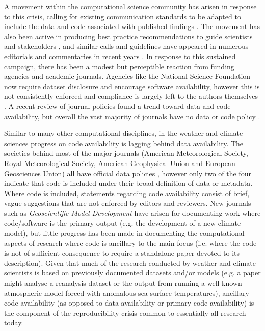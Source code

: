 A movement within the computational science community has arisen in response to this crisis, calling for existing communication standards to be adapted to include the data and code associated with published findings \citep[e.g.][]{Stodden2014}. The movement has also been active in producing best practice recommendations to guide scientists and stakeholders \citep[e.g.][]{Prlic2012,Stodden2012a,Sandve2013,Stodden2014}, and similar calls and guidelines have appeared in numerous editorials and commentaries in recent years \citep[e.g.][]{Barnes2010,Merali2010,Ince2012}. In response to this sustained campaign, there has been a modest but perceptible reaction from funding agencies and academic journals. Agencies like the National Science Foundation now require dataset disclosure and encourage software availability, however this is not consistently enforced and compliance is largely left to the authors themselves \citep{Stodden2013}. A recent review of journal policies found a trend toward data and code availability, but overall the vast majority of journals have no data or code policy \citep{Stodden2013}. 

Similar to many other computational disciplines, in the weather and climate sciences progress on code availability is lagging behind data availability. The societies behind most of the major journals (American Meteorological Society, Royal Meteorological Society, American Geophysical Union and European Geosciences Union) all have official data policies \citep[e.g.][]{Mayernik2015}, however only two of the four indicate that code is included under their broad definition of data or metadata. Where code is included, statements regarding code availability consist of brief, vague suggestions that are not enforced by editors and reviewers. New journals such as \textit{Geoscientific Model Development} have arisen for documenting work where code/software is the primary output (e.g. the development of a new climate model), but little progress has been made in documenting the computational aspects of research where code is ancillary to the main focus (i.e. where the code is not of sufficient consequence to require a standalone paper devoted to its description). Given that much of the research conducted by weather and climate scientists is based on previously documented datasets and/or models (e.g. a paper might analyse a reanalysis dataset or the output from running a well-known atmospheric model forced with anomalous sea surface temperatures), ancillary code availability (as opposed to data availability or primary code availability) is the component of the reproducibility crisis common to essentially all research today.

